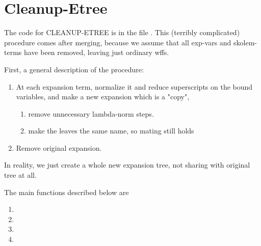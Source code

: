 \section{Cleanup-Etree}\label{cleanup-etree}

The code for CLEANUP-ETREE is in the file {\it{}}.
This (terribly complicated) procedure comes after merging, because we assume that all
exp-vars and skolem-terms have been removed, leaving just ordinary wffs.

First, a general description of the procedure:
\begin{enumerate}
\item  At each expansion term, normalize it and reduce superscripts on
      the bound variables, and make a new expansion 
      which is a "copy", 
\begin{enumerate}
\item  remove unnecessary lambda-norm steps.
\item  make the leaves the same name, so mating still holds
\end{enumerate}
\item  Remove original expansion.
\end{enumerate}
In reality, we just create a whole new expansion tree, not sharing
with original tree at all.

The main functions described below are
\begin{enumerate}
\item {}
\item {}  
\item {}  
\item {}
\end{enumerate}

